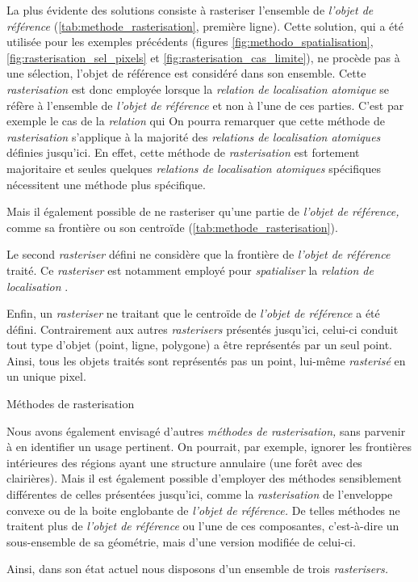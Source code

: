 La plus évidente des solutions consiste à rasteriser l'ensemble de \emph{l'objet de référence} (\autoref{tab:methode_rasterisation}, première ligne). Cette solution, qui a été utilisée pour les exemples précédents (\ie figures \ref{fig:methodo_spatialisation}, \ref{fig:rasterisation_sel_pixels} et \ref{fig:rasterisation_cas_limite}), ne procède pas à une sélection, l'objet de référence est considéré dans son ensemble.
%
Cette \emph{rasterisation} est donc employée lorsque la \emph{relation de localisation atomique} se réfère  à l'ensemble de \emph{l'objet de référence} et non à l'une de ces parties. C'est par exemple le cas de la \emph{relation}  qui
%
On pourra remarquer que cette méthode de \emph{rasterisation} s'applique à la majorité des \emph{relations de localisation atomiques} définies jusqu'ici. En effet, cette méthode de \emph{rasterisation} est fortement majoritaire et seules quelques \emph{relations de localisation atomiques} spécifiques nécessitent une méthode plus spécifique.

Mais il également possible de ne rasteriser qu'une partie de \emph{l'objet de référence,} comme sa frontière ou son centroïde (\autoref{tab:methode_rasterisation}).

Le second \emph{rasteriser} défini ne considère que la frontière de \emph{l'objet de référence} traité.
%
Ce \emph{rasteriser} est notamment employé pour \emph{spatialiser} la \emph{relation de localisation} .

Enfin, un \emph{rasteriser} ne traitant que le centroïde de \emph{l'objet de  référence} a été défini. Contrairement aux autres \emph{rasterisers} présentés jusqu'ici, celui-ci conduit tout type d'objet (\ie point, ligne, polygone) a être représentés par un seul point. Ainsi, tous les objets traités sont représentés pas un point, lui-même \emph{rasterisé} en un unique pixel.

\begin{table}
  \centering
  
  \caption{Méthodes de rasterisation}
  \label{tab:methode_rasterisation}
\end{table}

Nous avons également envisagé d'autres \emph{méthodes de rasterisation,} sans parvenir à en identifier un usage pertinent. On pourrait, par exemple, ignorer les frontières intérieures des régions ayant une structure annulaire (\eg une forêt avec des clairières). Mais il est également possible d'employer des méthodes sensiblement différentes de celles présentées jusqu'ici, comme la \emph{rasterisation} de l'enveloppe convexe ou de la boite englobante de \emph{l'objet de référence.} De telles méthodes ne traitent plus de \emph{l'objet de référence} ou l'une de ces composantes, c'est-à-dire un sous-ensemble de sa géométrie, mais d'une version modifiée de celui-ci.

Ainsi, dans son état actuel nous disposons d'un ensemble de trois \emph{rasterisers.}

